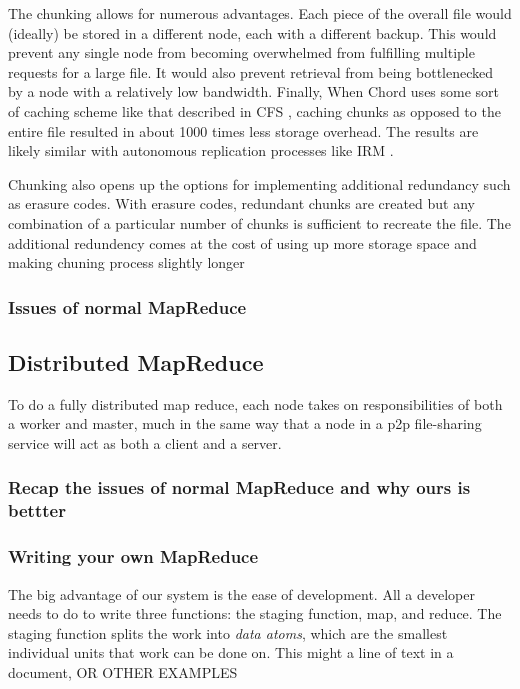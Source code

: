 \documentclass[conference, compsocconf, letterpaper]{IEEEtran}
\begin{document}
The chunking allows for numerous advantages.  Each piece of the overall file would (ideally) be stored in a different node, each with a different backup.  This would prevent any single node from becoming overwhelmed from fulfilling multiple requests for a large file.  It would also prevent retrieval from being bottlenecked by a node with a relatively low bandwidth. Finally, When Chord uses some sort of caching scheme like that described in CFS \cite{CFS}, caching chunks as opposed to the entire file resulted in about 1000 times less storage overhead.  The results are likely similar with autonomous replication processes like IRM \cite{IRM}.

Chunking also opens up the options for implementing additional redundancy such as erasure codes\cite{rizzo1997effective}. With erasure codes, redundant chunks are created but any combination of a particular number of chunks is sufficient to recreate the file.  The additional redundency comes at the cost of using up more storage space and making chuning process slightly longer


\subsubsection{Issues of normal MapReduce } 




\subsection{Distributed MapReduce}
To do a fully distributed map reduce, each node takes on responsibilities of both a worker and master, much in the same way that a node in a p2p file-sharing service will act as both a client and a server.   
\subsubsection{Recap the issues  of normal MapReduce  and why ours is bettter} 




\subsubsection{Writing your own MapReduce}
The big advantage of our system is the ease of development.  All a developer needs to do to write three functions: the staging function, map, and reduce.  The staging function splits the work into \emph{data atoms}, which are the smallest individual units that work can be done on.  This might a line of text in a document, OR OTHER EXAMPLES
\end{document}
